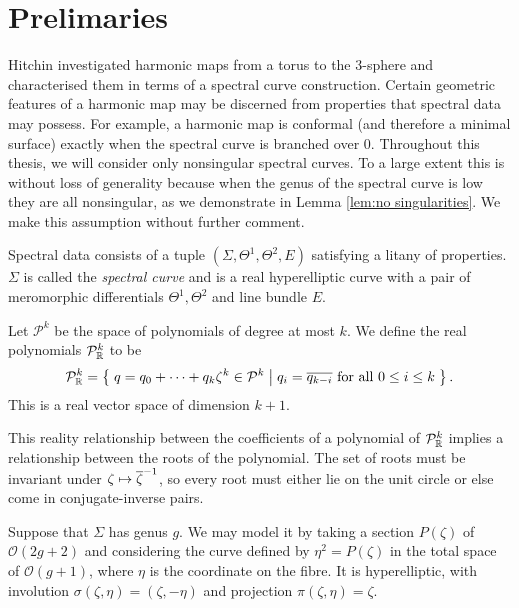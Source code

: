 \documentclass{article}
\begin{document}
\section{Prelimaries}
Hitchin \cite{Hitchin1990} investigated harmonic maps from a torus to the $3$-sphere and characterised them in terms of a spectral curve construction. Certain geometric features of a harmonic map may be discerned from properties that spectral data may possess. For example, a harmonic map is conformal (and therefore a minimal surface) exactly when the spectral curve is branched over $0$. Throughout this thesis, we will consider only nonsingular spectral curves. To a large extent this is without loss of generality because when the genus of the spectral curve is low they are all nonsingular, as we demonstrate in Lemma \ref{lem:no singularities}. We make this assumption without further comment.

Spectral data consists of a tuple $(\Sigma, \Theta^1, \Theta^2, E)$ satisfying a litany of properties. $\Sigma$ is called the \emph{spectral curve} and is a real hyperelliptic curve with a pair of meromorphic differentials $\Theta^1,\Theta^2$ and line bundle $E$.

\begin{defn}
\label{def:mathcal P}
Let $\mathcal{P}^k$ be the space of polynomials of degree at most $k$. We define the real polynomials $\mathcal{P}^k_{\mathbb{R}}$ to be
\[
\mathcal{P}^k_{\mathbb{R}}
= \left\{\;  q = q_0 + \dots + q_k \zeta^k \in \mathcal{P}^k  \;\middle|\;  q_i = \overline{q_{k-i}} \text{ for all } 0 \leq i \leq k \;\right\}.
\]
This is a real vector space of dimension $k+1$.
\end{defn}

This reality relationship between the coefficients of a polynomial of $\mathcal{P}^k_{\mathbb{R}}$ implies a relationship between the roots of the polynomial. The set of roots must be invariant under $\zeta\mapsto \overline{\zeta}^{-1}$, so every root must either lie on the unit circle or else come in conjugate-inverse pairs.

Suppose that $\Sigma$ has genus $g$. We may model it by taking a section $P(\zeta)$ of $\mathcal{O}(2g+2)$ and considering the curve defined by $\eta^2 = P(\zeta)$ in the total space of $\mathcal{O}(g+1)$, where $\eta$ is the coordinate on the fibre. It is hyperelliptic, with involution $\sigma(\zeta,\eta) = (\zeta,-\eta)$ and projection $\pi(\zeta,\eta) = \zeta$.
\end{document}

